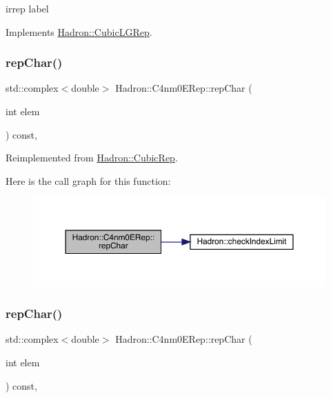 irrep label 

Implements \mbox{\hyperlink{structHadron_1_1CubicLGRep_a50f5ddbb8f4be4cee0106fa9e8c75e6c}{Hadron\+::\+Cubic\+L\+G\+Rep}}.

\mbox{\label{structHadron_1_1C4nm0ERep_ae2587ec63f886eaafedfaede40ebdba5}} 
\subsubsection{\texorpdfstring{repChar()}{repChar()}\hspace{0.1cm}{\footnotesize\ttfamily [1/2]}}
{\footnotesize\ttfamily std\+::complex$<$double$>$ Hadron\+::\+C4nm0\+E\+Rep\+::rep\+Char (\begin{DoxyParamCaption}\item[{int}]{elem }\end{DoxyParamCaption}) const\hspace{0.3cm}{\ttfamily [inline]}, {\ttfamily [virtual]}}



Reimplemented from \mbox{\hyperlink{structHadron_1_1CubicRep_af45227106e8e715e84b0af69cd3b36f8}{Hadron\+::\+Cubic\+Rep}}.

Here is the call graph for this function\+:
\nopagebreak
\begin{figure}[H]
\begin{center}
\leavevmode
\includegraphics[width=350pt]{d3/d8a/structHadron_1_1C4nm0ERep_ae2587ec63f886eaafedfaede40ebdba5_cgraph}
\end{center}
\end{figure}
\mbox{\label{structHadron_1_1C4nm0ERep_ae2587ec63f886eaafedfaede40ebdba5}} 
\subsubsection{\texorpdfstring{repChar()}{repChar()}\hspace{0.1cm}{\footnotesize\ttfamily [2/2]}}
{\footnotesize\ttfamily std\+::complex$<$double$>$ Hadron\+::\+C4nm0\+E\+Rep\+::rep\+Char (\begin{DoxyParamCaption}\item[{int}]{elem }\end{DoxyParamCaption}) const\hspace{0.3cm}{\ttfamily [inline]}, {\ttfamily [virtual]}}



